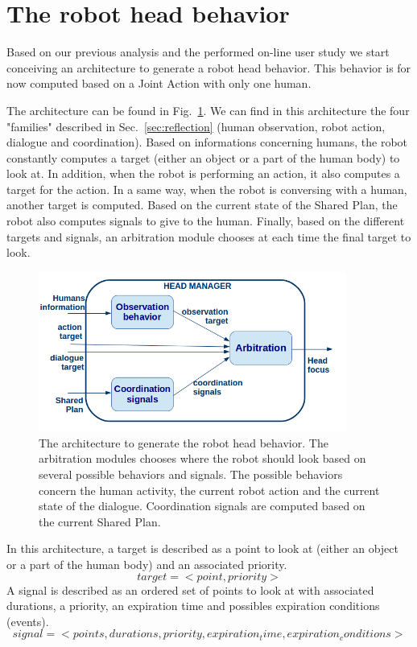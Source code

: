 \documentclass[english,a4paper,11pt,twoside]{StyleThese}
\begin{document}
\section{The robot head behavior}

Based on our previous analysis and the performed on-line user study we start conceiving an architecture to generate a robot head behavior. This behavior is for now computed based on a Joint Action with only one human.

The architecture can be found in Fig.~\ref{fig:headArchi}. We can find in this architecture the four "families" described in Sec.~\ref{sec:reflection} (human observation, robot action, dialogue and coordination). Based on informations concerning humans, the robot constantly computes a target (either an object or a part of the human body) to look at. In addition, when the robot is performing an action, it also computes a target for the action. In a same way, when the robot is conversing with a human, another target is computed. Based on the current state of the Shared Plan, the robot also computes signals to give to the human. Finally, based on the different targets and signals, an arbitration module chooses at each time the final target to look.

\begin{figure}[!h]
	\centering
    \includegraphics[width=0.9\textwidth]{figs/Chapter6/Head_archi.png}
    \caption{The architecture to generate the robot head behavior. The arbitration modules chooses where the robot should look based on several possible behaviors and signals. The possible behaviors concern the human activity, the current robot action and the current state of the dialogue. Coordination signals are computed based on the current Shared Plan.}
    \label{fig:headArchi}
\end{figure}

In this architecture, a target is described as a point to look at (either an object or a part of the human body) and an associated priority.
$$target = <point, priority>$$
A signal is described as an ordered set of points to look at with associated durations, a priority, an expiration time and possibles expiration conditions (events).
$$signal = <points, durations, priority, expiration_time, expiration_conditions>$$
\end{document}
